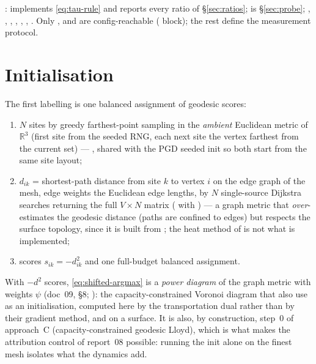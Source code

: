 \documentclass[11pt,a4paper]{article}
\begin{document}
\begin{tcolorbox}[colback=blue!4!white, colframe=blue!40!black,
                  title={Code: the window}, fontupper=\small]
: 
implements \eqref{eq:tau-rule} and reports every ratio of \S\ref{sec:ratios};
 is \S\ref{sec:probe}; ,
, , , ,
, . Only ,  and
 are config-reachable ( block); the rest define the
measurement protocol.
\end{tcolorbox}

\section{Initialisation}
\label{sec:init}

The first labelling is one balanced assignment of geodesic scores:
\begin{enumerate}[itemsep=1pt]
  \item $N$ sites by greedy farthest-point sampling in the \emph{ambient}
    Euclidean metric of $\mathbb{R}^3$ (first site from the seeded RNG, each
    next site the vertex farthest from the current set) ---
    , shared with the PGD seeded init so both
    start from the same site layout;
  \item $d_{ik}$ = shortest-path distance from site $k$ to vertex $i$ on the
    edge graph of the mesh, edge weights the Euclidean edge lengths, by $N$
    single-source Dijkstra searches returning the full $V \times N$ matrix
    ( with ) --- a graph metric that \emph{over}-estimates the
    geodesic distance (paths are confined to edges) but respects the surface
    topology, since it is built from ; the heat method of
    \cite{crane2013geodesics} is not what is implemented;
  \item scores $s_{ik} = -d_{ik}^2$ and one full-budget balanced assignment.
\end{enumerate}
With $-d^2$ scores, \eqref{eq:shifted-argmax} is a \emph{power diagram} of the
graph metric with weights $\psi$ (doc~09, \S8; \cite{aurenhammer1998minkowski}):
the capacity-constrained Voronoi diagram that \cite{bogosel2021longest} also use
as an initialisation, computed here by the transportation dual rather than by
their gradient method, and on a surface. It is also, by construction, step~0 of
approach~C (capacity-constrained geodesic Lloyd), which is what makes the
attribution control of report~08 possible: running the init alone on the finest
mesh isolates what the dynamics add.
\end{document}
